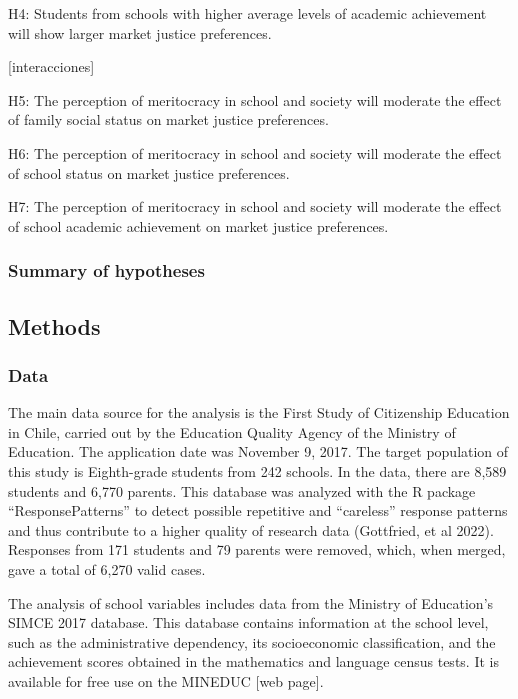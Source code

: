 \documentclass[
  letterpaper,
  DIV=11,
  numbers=noendperiod]{scrartcl}
\begin{document}
H4: Students from schools with higher average levels of academic
achievement will show larger market justice preferences.

{[}interacciones{]}

H5: The perception of meritocracy in school and society will moderate
the effect of family social status on market justice preferences.

H6: The perception of meritocracy in school and society will moderate
the effect of school status on market justice preferences.

H7: The perception of meritocracy in school and society will moderate
the effect of school academic achievement on market justice preferences.

\subsubsection{Summary of hypotheses}\label{summary-of-hypotheses}

\subsection{}\label{section}

\subsection{Methods}\label{methods}

\subsubsection{Data}\label{data}

The main data source for the analysis is the First Study of Citizenship
Education in Chile, carried out by the Education Quality Agency of the
Ministry of Education. The application date was November 9, 2017. The
target population of this study is Eighth-grade students from 242
schools. In the data, there are 8,589 students and 6,770 parents. This
database was analyzed with the R package ``ResponsePatterns'' to detect
possible repetitive and ``careless'' response patterns and thus
contribute to a higher quality of research data (Gottfried, et al 2022).
Responses from 171 students and 79 parents were removed, which, when
merged, gave a total of 6,270 valid cases.

The analysis of school variables includes data from the Ministry of
Education's SIMCE 2017 database. This database contains information at
the school level, such as the administrative dependency, its
socioeconomic classification, and the achievement scores obtained in the
mathematics and language census tests. It is available for free use on
the MINEDUC {[}web page{]}.
\end{document}
